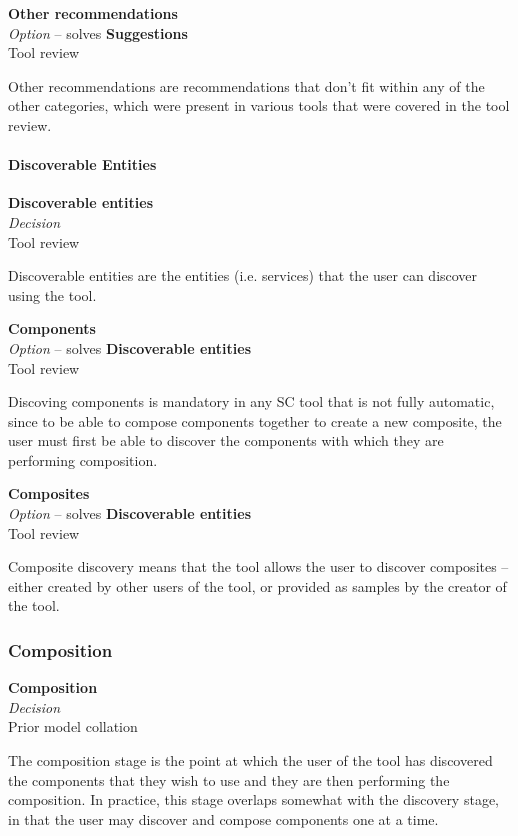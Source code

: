 \textbf{Other recommendations} \\ \emph{Option} -- solves \textbf{Suggestions} \\ Tool review

Other recommendations are recommendations that don't fit within any of the other categories, which were present in various tools that were covered in the tool review.

\paragraph{Discoverable Entities}

\textbf{Discoverable entities} \\ \emph{Decision} \\ Tool review

Discoverable entities are the entities (i.e. services) that the user can discover using the tool.

\textbf{Components} \\ \emph{Option} -- solves \textbf{Discoverable entities} \\ Tool review

Discoving components is mandatory in any SC tool that is not fully automatic, since to be able to compose components together to create a new composite, the user must first be able to discover the components with which they are performing composition.

\textbf{Composites} \\ \emph{Option} -- solves \textbf{Discoverable entities} \\ Tool review

Composite discovery means that the tool allows the user to discover composites -- either created by other users of the tool, or provided as samples by the creator of the tool.

\subsubsection{Composition}

\textbf{Composition} \\ \emph{Decision} \\ Prior model collation \cite{Mehandjiev2012}

The composition stage is the point at which the user of the tool has discovered the components that they wish to use and they are then performing the composition. In practice, this stage overlaps somewhat with the discovery stage, in that the user may discover and compose components one at a time.

